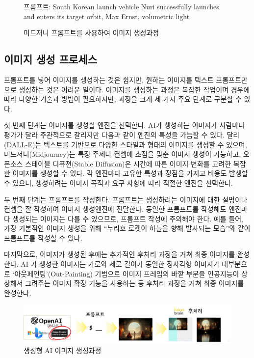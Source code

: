 \documentclass[
  letterpaper,
]{book}
\begin{document}
\begin{figure}
\begin{minipage}[t]{\linewidth}
{{}

\caption{프롬프트: South Korean launch vehicle Nuri successfully
launches and enters its target orbit, Max Ernst, volumetric light}

}

\end{minipage}%

\caption{\label{fig-nuri}미드저니 프롬프트를 사용하여 이미지 생성과정}

\end{figure}

\hypertarget{uxc774uxbbf8uxc9c0-uxc0dduxc131-uxd504uxb85cuxc138uxc2a4}{%
\subsection{이미지 생성
프로세스}\label{uxc774uxbbf8uxc9c0-uxc0dduxc131-uxd504uxb85cuxc138uxc2a4}}

프롬프트를 넣어 이미지를 생성하는 것은 쉽지만, 원하는 이미지를 텍스트
프롬프트만으로 생성하는 것은 어려운 일이다. 이미지를 생성하는 과정은
복잡한 작업이며 경우에 따라 다양한 기술과 방법이 필요하지만, 과정을 크게
세 가지 주요 단계로 구분할 수 있다.

첫 번째 단계는 이미지를 생성할 엔진을 선택한다. AI가 생성하는 이미지가
사람마다 평가가 달라 주관적으로 갈리지만 다음과 같이 엔진의 특성을
가늠할 수 있다. 달리(DALL-E)는 텍스트를 기반으로 다양한 스타일과 형태의
이미지를 생성할 수 있으며, 미드저니(Midjourney)는 특정 주제나 컨셉에
초점을 맞춘 이미지 생성이 가능하고, 오픈소스 스테이블 디퓨젼(Stable
Diffusion)은 시간에 따른 이미지 변화를 고려한 복잡한 이미지를 생성할 수
있다. 각 엔진마다 고유한 특성과 장점을 가지고 비용도 발생할 수 있으니,
생성하려는 이미지 목적과 요구 사항에 따라 적절한 엔진을 선택한다.

두 번째 단계는 프롬프트를 작성한다. 프롬프트는 생성하려는 이미지에 대한
설명이나 컨셉을 잘 작성하여 이미지 생성엔진에 전달한다. 동일한
프롬프트를 작성해도 엔진마다 생성되는 이미지는 다를 수 있으므로,
프롬프트 작성에 주의해야 한다. 예를 들어, 가장 기본적인 이미지 생성을
위해 ``누리호 로켓이 하늘을 향해 발사되는 모습''와 같이 프롬프트를
작성할 수 있다.

마지막으로, 이미지가 생성된 후에는 추가적인 후처리 과정을 거쳐 최종
이미지를 완성한다. AI 가 생성한 이미지는 가로와 세로 길이가 동일한
정사각형 이미지가 대부분으로 `아웃페인팅'(Out-Painting) 기법으로 이미지
프레임의 바깥 부분을 인공지능이 상상해서 그려주는 이미지 확장 기능을
사용하는 등 후처리 과정을 거쳐 최종 이미지를 완성한다.

\begin{figure}

{\centering \includegraphics{images/kakao_bedit_creator.jpg}

}

\caption{생성형 AI 이미지 생성과정}

\end{figure}
\end{document}

